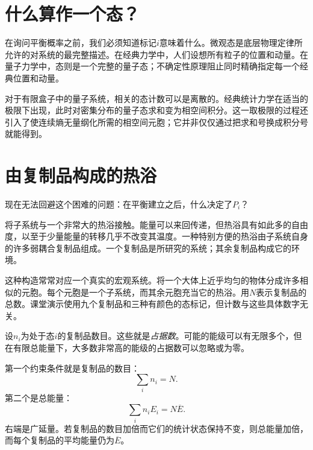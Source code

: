\section{什么算作一个态？}

在询问平衡概率之前，我们必须知道标记\(i\)意味着什么。微观态是底层物理定律所允许的对系统的最完整描述。在经典力学中，人们设想所有粒子的位置和动量。在量子力学中，态则是一个完整的量子态；不确定性原理阻止同时精确指定每一个经典位置和动量。

对于有限盒子中的量子系统，相关的态计数可以是离散的。经典统计力学在适当的极限下出现，此时对密集分布的量子态求和变为相空间积分。这一取极限的过程还引入了使连续熵无量纲化所需的相空间元胞；它并非仅仅通过把求和号换成积分号就能得到。

\begin{classroomqa}
\end{classroomqa}

\section{由复制品构成的热浴}

现在无法回避这个困难的问题：在平衡建立之后，什么决定了\(P_i\)？

将子系统与一个非常大的热浴接触。能量可以来回传递，但热浴具有如此多的自由度，以至于少量能量的转移几乎不改变其温度。一种特别方便的热浴由子系统自身的许多弱耦合复制品组成。一个复制品是所研究的系统；其余复制品构成它的环境。

这种构造常常对应一个真实的宏观系统。将一个大体上近乎均匀的物体分成许多相似的元胞。每个元胞是一个子系统，而其余元胞充当它的热浴。用\(N\)表示复制品的总数。课堂演示使用九个复制品和三种有颜色的态标记，但计数与这些具体数字无关。

设\(n_i\)为处于态\(i\)的复制品数目。这些就是\emph{占据数}。可能的能级可以有无限多个，但在有限总能量下，大多数非常高的能级的占据数可以忽略或为零。

第一个约束条件就是复制品的数目：
\begin{equation}
 \sum_i n_i=N.
 \label{eq:sm3-number-constraint}
\end{equation}
第二个是总能量：
\begin{equation}
 \sum_i n_iE_i=N\overline E.
 \label{eq:sm3-total-energy-constraint}
\end{equation}
右端是广延量。若复制品的数目加倍而它们的统计状态保持不变，则总能量加倍，而每个复制品的平均能量仍为\(\overline E\)。


